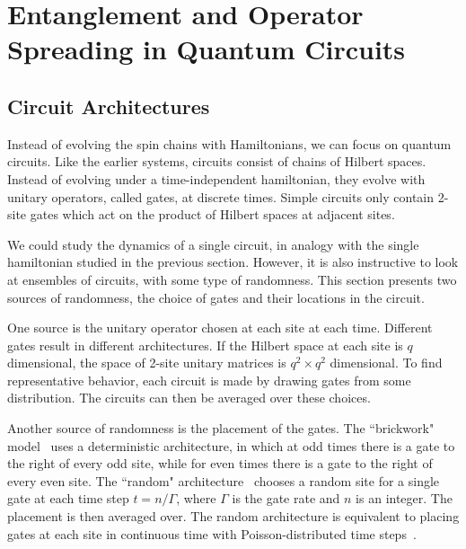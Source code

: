 \section{Entanglement and Operator Spreading in Quantum Circuits} \label{sec:circuits}

\subsection{Circuit Architectures} \label{sub:arch}

Instead of evolving the spin chains with Hamiltonians, we can focus on quantum circuits. Like the earlier systems, circuits consist of chains of Hilbert spaces. Instead of evolving under a time-independent hamiltonian, they evolve with unitary operators, called gates, at discrete times. Simple circuits only contain 2-site gates which act on the product of Hilbert spaces at adjacent sites. 

We could study the dynamics of a single circuit, in analogy with the single hamiltonian studied in the previous section. However, it is also instructive to look at ensembles of circuits, with some type of randomness. This section presents two sources of randomness, the choice of gates and their locations in the circuit.

One source is the unitary operator chosen at each site at each time. Different gates result in different architectures. 
If the Hilbert space at each site is $q$ dimensional, the space of 2-site unitary matrices is $q^2\times q^2$ dimensional. To find representative behavior, each circuit is made by drawing gates from some distribution. The circuits can then be averaged over these choices. 

Another source of randomness is the placement of the gates. The ``brickwork" model~\cite{Keyserlingk} uses a deterministic architecture, in which at odd times there is a gate to the right of every odd site, while for even times there is a gate to the right of every even site. The ``random" architecture~\cite{Nahum2017} chooses a random site for a single gate at each time step $t = n/\Gamma$, where $\Gamma$ is the gate rate and $n$ is an integer. The placement is then averaged over. The random architecture is equivalent to placing gates at each site in continuous time with Poisson-distributed time steps~\cite{Nahum2017}.

